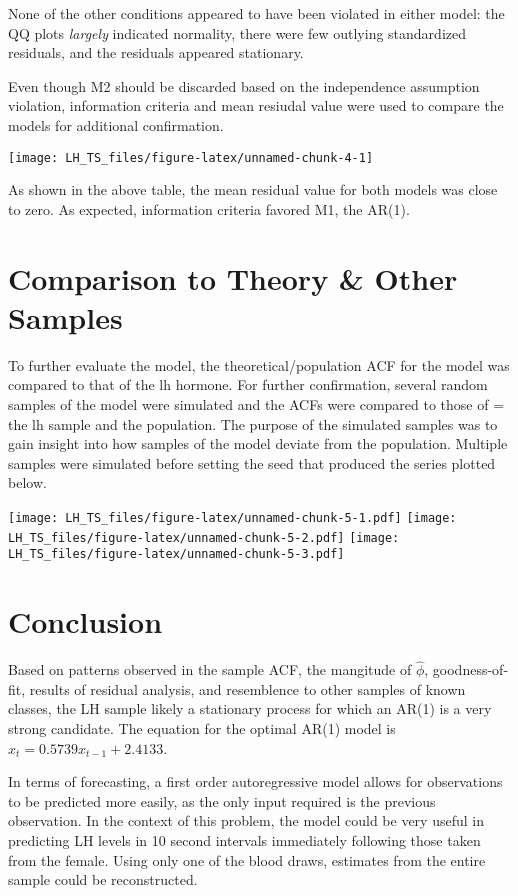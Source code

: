 \documentclass[]{article}
\begin{document}
None of the other conditions appeared to have been violated in either
model: the QQ plots \emph{largely} indicated normality, there were few
outlying standardized residuals, and the residuals appeared stationary.

Even though M2 should be discarded based on the independence assumption
violation, information criteria and mean resiudal value were used to
compare the models for additional confirmation.

\begin{center}\texttt{[image: LH\_TS\_files/figure-latex/unnamed-chunk-4-1]} \end{center}

As shown in the above table, the mean residual value for both models was
close to zero. As expected, information criteria favored M1, the AR(1).

\section{Comparison to Theory \& Other
Samples}\label{comparison-to-theory-other-samples}

To further evaluate the model, the theoretical/population ACF for the
model was compared to that of the lh hormone. For further confirmation,
several random samples of the model were simulated and the ACFs were
compared to those of = the lh sample and the population. The purpose of
the simulated samples was to gain insight into how samples of the model
deviate from the population. Multiple samples were simulated before
setting the seed that produced the series plotted below.

\texttt{[image: LH\_TS\_files/figure-latex/unnamed-chunk-5-1.pdf]}
\texttt{[image: LH\_TS\_files/figure-latex/unnamed-chunk-5-2.pdf]}
\texttt{[image: LH\_TS\_files/figure-latex/unnamed-chunk-5-3.pdf]}

\section{Conclusion}\label{conclusion}

Based on patterns observed in the sample ACF, the mangitude of
\(\hat{\phi}\), goodness-of-fit, results of residual analysis, and
resemblence to other samples of known classes, the LH sample likely a
stationary process for which an AR(1) is a very strong candidate. The
equation for the optimal AR(1) model is \(x_t=0.5739x_{t-1}+2.4133\).

In terms of forecasting, a first order autoregressive model allows for
observations to be predicted more easily, as the only input required is
the previous observation. In the context of this problem, the model
could be very useful in predicting LH levels in 10 second intervals
immediately following those taken from the female. Using only one of the
blood draws, estimates from the entire sample could be reconstructed.
\end{document}
